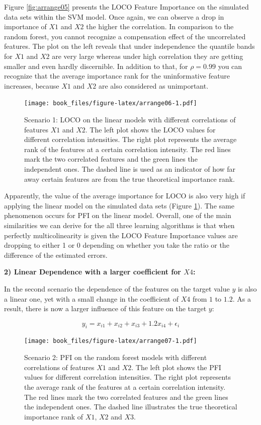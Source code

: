 \documentclass[]{krantz}
\begin{document}
Figure \ref{fig:arrange05} presents the LOCO Feature Importance on the
simulated data sets within the SVM model. Once again, we can observe a
drop in importance of \(X1\) and \(X2\) the higher the correlation. In
comparison to the random forest, you cannot recognize a compensation
effect of the uncorrelated features. The plot on the left reveals that
under independence the quantile bands for \(X1\) and \(X2\) are very
large whereas under high correlation they are getting smaller and even
hardly discernible. In addition to that, for \(\rho=0.99\) you can
recognize that the average importance rank for the uninformative feature
increases, because \(X1\) and \(X2\) are also considered as unimportant.

\begin{figure}
\centering
\texttt{[image: book\_files/figure-latex/arrange06-1.pdf]}
\caption{\label{fig:arrange06}Scenario 1: LOCO on the linear models with
different correlations of features \(X1\) and \(X2\). The left plot
shows the LOCO values for different correlation intensities. The right
plot represents the average rank of the features at a certain
correlation intensity. The red lines mark the two correlated features
and the green lines the independent ones. The dashed line is used as an
indicator of how far away certain features are from the true theoretical
importance rank.}
\end{figure}

Apparently, the value of the average importance for LOCO is also very
high if applying the linear model on the simulated data sets (Figure
\ref{fig:arrange06}). The same phenomenon occurs for PFI on the linear
model. Overall, one of the main similarities we can derive for the all
three learning algorithms is that when perfectly multicolinearity is
given the LOCO Feature Importance values are dropping to either 1 or 0
depending on whether you take the ratio or the difference of the
estimated errors.

\textbf{2) Linear Dependence with a larger coefficient for \(X4\):}

In the second scenario the dependence of the features on the target
value \(y\) is also a linear one, yet with a small change in the
coefficient of \(X4\) from \(1\) to \(1.2\). As a result, there is now a
larger influence of this feature on the target \(y\):

\[
y_{i} = x_{i1}+x_{i2}+x_{i3}+1.2x_{i4}+\epsilon_{i}
\]

\begin{figure}
\centering
\texttt{[image: book\_files/figure-latex/arrange07-1.pdf]}
\caption{\label{fig:arrange07}Scenario 2: PFI on the random forest models
with different correlations of features \(X1\) and \(X2\). The left plot
shows the PFI values for different correlation intensities. The right
plot represents the average rank of the features at a certain
correlation intensity. The red lines mark the two correlated features
and the green lines the independent ones. The dashed line illustrates
the true theoretical importance rank of \(X1\), \(X2\) and \(X3\).}
\end{figure}
\end{document}
